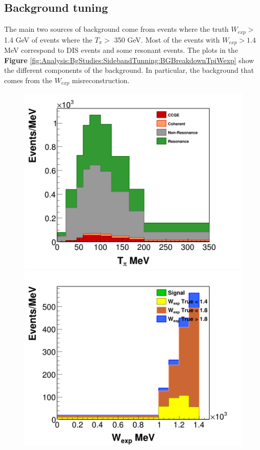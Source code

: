 \subsection{Background tuning}
\label{Cap:Analysis:BgStudies:SidebandTuning}
The main two sources of background come from events where the truth $W_{exp} >$ 1.4 GeV of events where the $T_\pi > $ 350 GeV. Most of the events with $W_{exp} > 1.4 $ MeV correspond to DIS events and some resonant events. The plots in the \textbf{Figure} \ref{fig:Analysis:BgStudies:SidebandTunning:BGBreakdownTpiWexp} show the different components of the background. In particular, the background that comes from the $W_{exp}$ misreconstruction. 

\begin{figure}[!htb]
    \centering
    \includegraphics[scale=0.2]{Figures/Chapter4/BGStudies/Bd_Background_mixtpi_Int.png}
    \includegraphics[scale=0.2]{Figures/Chapter4/BGStudies/Bd_Background_wexp_WSB.png}

\end{figure}
